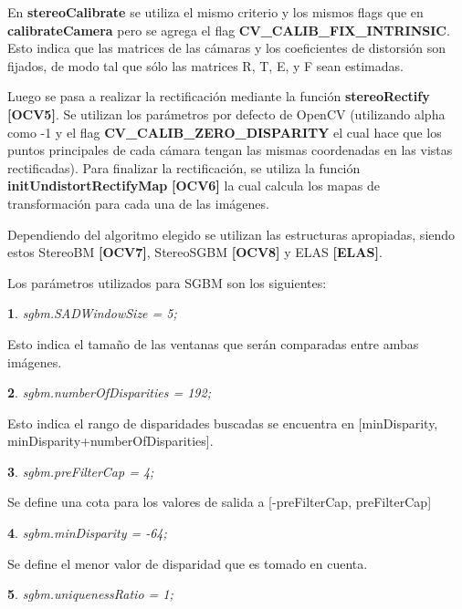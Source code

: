 \documentclass[11pt,a4paper,titlepage]{article}
\newtheorem{mytheorem}{}
\newenvironment{theorem}%
  {\begin{lrbox}{\thmbox}%
   \begin{minipage}{\dimexpr\linewidth-2\fboxsep}
   \begin{mytheorem}}%
  {\end{mytheorem}%
   \end{minipage}%
   \end{lrbox}%
   \begin{trivlist}
     \item[]\colorbox{lightgray}{\usebox\thmbox}
   \end{trivlist}}
\begin{document}
En \textbf{stereoCalibrate} se utiliza el mismo criterio y los mismos flags que en \textbf{calibrateCamera} pero se agrega el flag \textbf{CV\_CALIB\_FIX\_INTRINSIC}. Esto indica que las matrices de las cámaras y los coeficientes de distorsión son fijados, de modo tal que sólo las matrices R, T, E, y F sean estimadas.

Luego se pasa a realizar la rectificación mediante la función \textbf{stereoRectify} \textbf{[OCV5]}. Se utilizan los parámetros por defecto de OpenCV (utilizando alpha como -1 y el flag \textbf{CV\_CALIB\_ZERO\_DISPARITY} el cual hace que los puntos principales de cada cámara tengan las mismas coordenadas en las vistas rectificadas).
Para finalizar la rectificación, se utiliza la función \textbf{initUndistortRectifyMap} \textbf{[OCV6]} la cual calcula los mapas de transformación para cada una de las imágenes.

Dependiendo del algoritmo elegido se utilizan las estructuras apropiadas, siendo estos StereoBM \textbf{[OCV7]}, StereoSGBM \textbf{[OCV8]} y ELAS \textbf{[ELAS]}.

Los parámetros utilizados para SGBM son los siguientes:

\begin{theorem}
sgbm.SADWindowSize = 5;
\end{theorem}

Esto indica el tamaño de las ventanas que serán comparadas entre ambas imágenes.

\begin{theorem}
sgbm.numberOfDisparities = 192;
\end{theorem}

Esto indica el rango de disparidades buscadas se encuentra en [minDisparity, minDisparity+numberOfDisparities].

\begin{theorem}
sgbm.preFilterCap = 4;
\end{theorem}

Se define una cota para los valores de salida a [-preFilterCap, preFilterCap]

\begin{theorem}
sgbm.minDisparity = -64;
\end{theorem}

Se define el menor valor de disparidad que es tomado en cuenta.

\begin{theorem}
sgbm.uniquenessRatio = 1;
\end{theorem}
\end{document}
